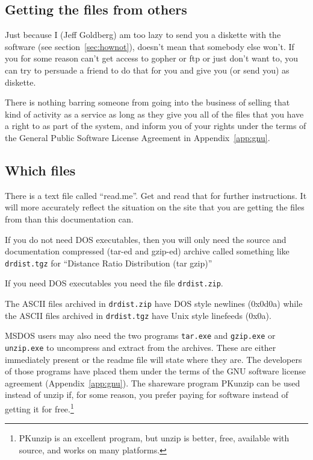 \documentclass[%
	11pt,
        a4paper,
        twoside]{workrep}
\newcommand*{\prg}[1]{\textsf{#1}}		%
\newcommand*{\file}[1]{\texttt{#1}}		%
\begin{document}
\subsection{Getting the files from others}

Just because I (Jeff Goldberg) am too lazy to send you a diskette
with the software (see section~\ref{sec:hownot}), doesn't mean that
somebody else won't.  If you for some reason can't get access to
gopher or ftp or just don't want to, you can try to persuade a friend
to do that for you and give you (or send you) as diskette.

There is nothing barring someone from going into the business of
selling that kind of activity as a service as long as they give you
all of the files that you have a right to as part of the system, and
inform you of your rights under the terms of the General Public
Software License Agreement in Appendix~\ref{app:gnu}\@.

\subsection{Which files}

There is a text file called ``read.me''.  Get and read that for further
instructions.  It will more accurately reflect the situation on the
site that you are getting the files from than this documentation can.

If you do not need DOS executables, then you will only need the
source and documentation compressed (tar-ed and gzip-ed) archive
called something like \file{drdist.tgz}  for
``Distance Ratio Distribution (tar gzip)''

If you need DOS executables you need the file \file{drdist.zip}.

The ASCII files archived in \file{drdist.zip} have DOS style newlines
(0x0d0a) while the ASCII files archived in \file{drdist.tgz} have
Unix style linefeeds (0x0a).

MSDOS users may also need the two programs \file{tar.exe} and \file{gzip.exe}
or \file{unzip.exe} to uncompress and extract from the archives.  These
are either immediately present or the readme file will state where they
are.  The developers of those programs have placed them under the
terms of the GNU software license agreement (Appendix~\ref{app:gnu}\@).
The shareware program \prg{PKunzip} can be used instead of \prg{unzip}
if, for some reason, you prefer paying for software instead of getting
it for free.\footnote{\prg{PKunzip} is an excellent program, but \prg{unzip}
is better, free, available with source, and works on many platforms.}
\end{document}
